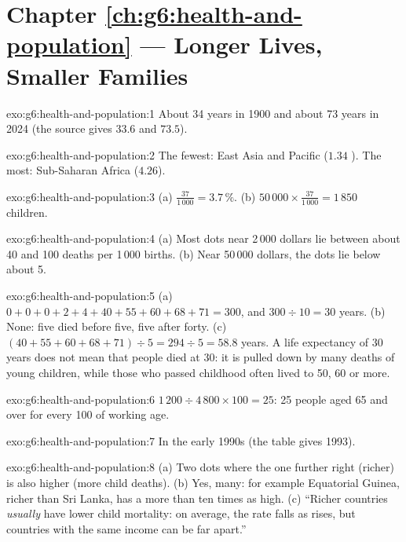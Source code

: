 \section*{Chapter \ref{ch:g6:health-and-population} --- Longer Lives, Smaller Families}

\begin{solution}{exo:g6:health-and-population:1}
About 34 years in 1900 and about 73 years in 2024 (the source gives $33.6$ and
$73.5$).
\end{solution}

\begin{solution}{exo:g6:health-and-population:2}
The fewest: East Asia and Pacific ($1.34$ ). The most:
Sub-Saharan Africa ($4.26$).
\end{solution}

\begin{solution}{exo:g6:health-and-population:3}
(a) $\frac{37}{1\,000} = 3.7\,\%$. (b) $50\,000 \times \frac{37}{1\,000} = 1\,850$
children.
\end{solution}

\begin{solution}{exo:g6:health-and-population:4}
(a) Most dots near 2\,000 dollars lie between about 40 and 100 deaths per
1\,000 births. (b) Near 50\,000 dollars, the dots lie below about 5.
\end{solution}

\begin{solution}{exo:g6:health-and-population:5}
(a) $0 + 0 + 0 + 2 + 4 + 40 + 55 + 60 + 68 + 71 = 300$, and $300 \div 10 = 30$
years. (b) None: five died before five, five after forty. (c) $(40 + 55 + 60 + 68
+ 71) \div 5 = 294 \div 5 = 58.8$ years. A life expectancy of 30 years does not
mean that people died at 30: it is pulled down by many deaths of young children,
while those who passed childhood often lived to 50, 60 or more.
\end{solution}

\begin{solution}{exo:g6:health-and-population:6}
$1\,200 \div 4\,800 \times 100 = 25$: 25 people aged 65 and over for every 100
of working age.
\end{solution}

\begin{solution}{exo:g6:health-and-population:7}
In the early 1990s (the table gives 1993).
\end{solution}

\begin{solution}{exo:g6:health-and-population:8}
(a) Two dots where the one further right (richer) is also higher (more child
deaths). (b) Yes, many: for example Equatorial Guinea, richer than Sri Lanka, has a
 more than ten times as high. (c) ``Richer countries
\emph{usually} have lower child mortality: on average, the rate falls as  rises, but countries with the same income can be far apart.''
\end{solution}

